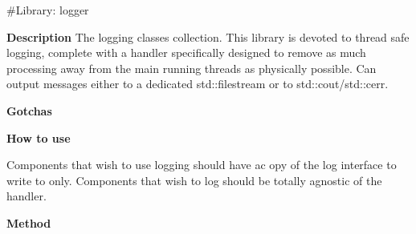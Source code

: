 \#\+Library\+: logger

{\bfseries{Description}} The logging classes collection. This library is devoted to thread safe logging, complete with a handler specifically designed to remove as much processing away from the main running threads as physically possible. Can output messages either to a dedicated std\+::filestream or to std\+::cout/std\+::cerr.

{\bfseries{Gotchas}}

{\bfseries{How to use}}

Components that wish to use logging should have ac opy of the log interface to write to only. Components that wish to log should be totally agnostic of the handler.

{\bfseries{Method}} 